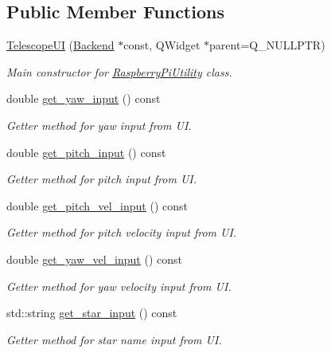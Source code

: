 \subsection*{Public Member Functions}
\begin{DoxyCompactItemize}
\item 
\mbox{\hyperlink{classTelescopeUI_a15dc7e30e1387dc23213bec7ca74012c}{Telescope\+UI}} (\mbox{\hyperlink{classBackend}{Backend}} $\ast$const, Q\+Widget $\ast$parent=Q\+\_\+\+N\+U\+L\+L\+P\+TR)
\begin{DoxyCompactList}\small\item\em Main constructor for \mbox{\hyperlink{classRaspberryPiUtility}{Raspberry\+Pi\+Utility}} class. \end{DoxyCompactList}\item 
double \mbox{\hyperlink{classTelescopeUI_a617d9d50d6e4a50f58bf65658b2191b8}{get\+\_\+yaw\+\_\+input}} () const
\begin{DoxyCompactList}\small\item\em Getter method for yaw input from UI. \end{DoxyCompactList}\item 
double \mbox{\hyperlink{classTelescopeUI_a874796893c7941992ed16760d62409c5}{get\+\_\+pitch\+\_\+input}} () const
\begin{DoxyCompactList}\small\item\em Getter method for pitch input from UI. \end{DoxyCompactList}\item 
double \mbox{\hyperlink{classTelescopeUI_a1d2675c14ee541617257b68cef48b857}{get\+\_\+pitch\+\_\+vel\+\_\+input}} () const
\begin{DoxyCompactList}\small\item\em Getter method for pitch velocity input from UI. \end{DoxyCompactList}\item 
double \mbox{\hyperlink{classTelescopeUI_a5e3914156cf53cb53851285186d3fbfc}{get\+\_\+yaw\+\_\+vel\+\_\+input}} () const
\begin{DoxyCompactList}\small\item\em Getter method for yaw velocity input from UI. \end{DoxyCompactList}\item 
std\+::string \mbox{\hyperlink{classTelescopeUI_a6253863c7f48f2f403b44e1811f6dd2b}{get\+\_\+star\+\_\+input}} () const
\begin{DoxyCompactList}\small\item\em Getter method for star name input from UI. \end{DoxyCompactList}\item 

\end{DoxyCompactItemize}
